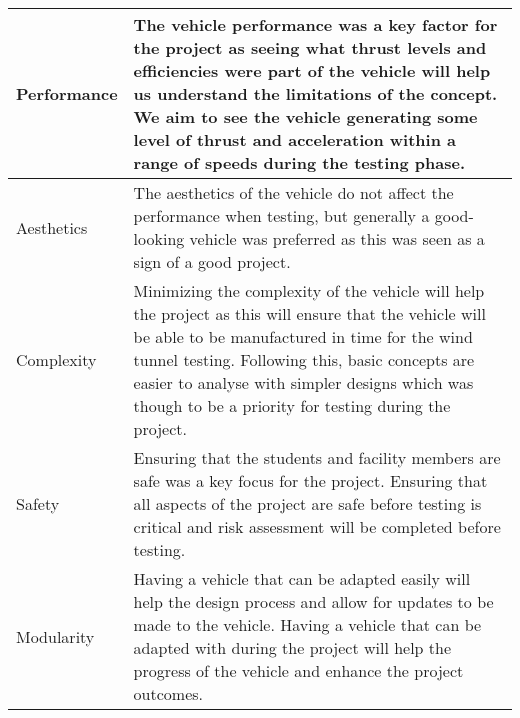 \begin{table}[H]
\begin{tabular}{|
>{\columncolor[HTML]{\CellColor}}l |p{14cm}|}
Performance       & The vehicle performance was a key factor for the project as seeing what thrust levels and efficiencies were part of the vehicle will help us understand the limitations of the concept. We aim to see the vehicle generating some level of thrust and acceleration within a range of speeds during the testing phase.                                                                                     \\ \hline
Aesthetics        & The aesthetics of the vehicle do not affect the performance when testing, but generally a good-looking vehicle was preferred as this was seen as a sign of a good project.                                                                                                                                                                                                                                                                                     \\ \hline
Complexity        & Minimizing the complexity of the vehicle will help the project as this will ensure that the vehicle will be able to be manufactured in time for the wind tunnel testing. Following this, basic concepts are easier to analyse with simpler designs which was though to be a priority for testing during the project.                                                                                                                                                                                                   \\ \hline
Safety            & Ensuring that the students and facility members are safe was a key focus for the project. Ensuring that all aspects of the project are safe before testing is critical and risk assessment will be completed before testing.                                                                                                                                                                                                                     \\ \hline
Modularity        & Having a vehicle that can be adapted easily will help the design process and allow for updates to be made to the vehicle. Having a vehicle that can be adapted with during the project will help the progress of the vehicle and enhance the project outcomes.                                                                                                                                                                                                    \\ \hline
\end{tabular}
\end{table}